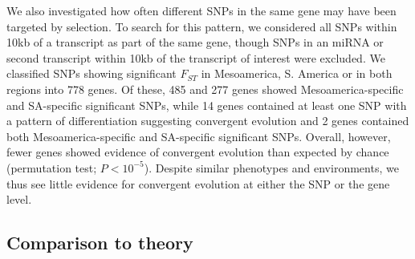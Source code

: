 We also investigated how often different SNPs in the same gene may have been targeted by selection. 
To search for this pattern, we considered all SNPs within 10kb of a transcript as part of the same gene, though SNPs in an miRNA or second transcript within 10kb of the transcript of interest were excluded.  
We classified SNPs showing significant $F_{ST}$ in Mesoamerica, S. America or in both regions into 778 genes. 
Of these, 485 and 277 genes showed Mesoamerica-specific and SA-specific significant SNPs, while 14 genes contained at least one SNP with a pattern of differentiation suggesting convergent evolution and 2 genes contained both Mesoamerica-specific and SA-specific significant SNPs. 
Overall, however, fewer genes showed evidence of convergent evolution than expected by chance (permutation test; $P<10^{-5}$). 
Despite similar phenotypes and environments, we thus see little evidence for convergent evolution at either the SNP or the gene level.  

\subsection*{Comparison to theory}


